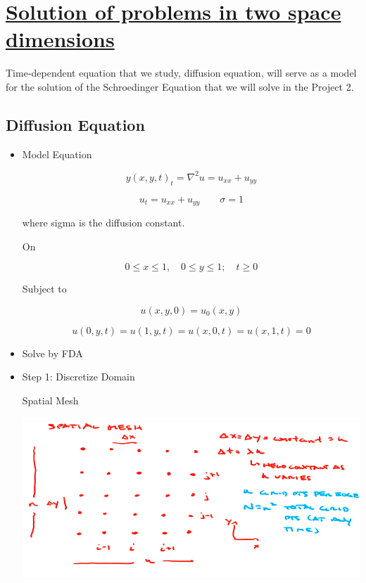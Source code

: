 \def \secname {Solution of problems in two space dimensions}

\section[\secname]{\hyperlink{toc}{\secname}}




Time-dependent equation that we study, diffusion equation, will serve as a model for the solution of the Schroedinger Equation that we will solve in the Project 2.

\subsection{Diffusion Equation}

\begin{itemize}
    \item Model Equation

    \[ y(x,y,t)_t = \nabla ^2 u = u_{xx} + u_{yy}\]

    \[ u_t = u_{xx} + u_{yy} \qquad \sigma = 1\]

    where sigma is the diffusion constant.

    On 

    \[ 0 \le x \le 1, \quad 0 \le y \le 1; \quad t\ge 0\]

    Subject to 

    \[ u(x,y,0) = u_0(x,y)\]

    \[ u(0,y,t) = u(1,y,t) = u(x,0,t) = u(x,1,t) = 0\]

    \item Solve by FDA

    \item Step 1: Discretize Domain

    Spatial Mesh

    \includegraphics[width  = \linewidth]{Images/2D_spatialmesh_diffusion.png}


\end{itemize}
